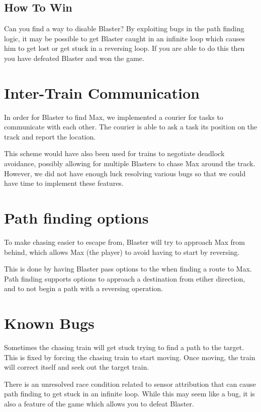 \documentclass[pdftex,10pt,a4paper]{article}
\begin{document}
\subsection*{How To Win}

Can you find a way to disable Blaster? By exploiting bugs in the path
finding logic, it may be possible to get Blaster caught in an infinite
loop which causes him to get lost or get stuck in a reversing loop. If
you are able to do this then you have defeated Blaster and won the
game.

\section*{Inter-Train Communication}

In order for Blaster to find Max, we implemented a courier for
 tasks to communicate with each other. The courier is able
to ask a  task its position on the track and report the
location.

This scheme would have also been used for trains to negotiate deadlock
avoidance, possibly allowing for multiple Blasters to chase Max around
the track. However, we did not have enough luck resolving various bugs
so that we could have time to implement these features.

\section*{Path finding options}

To make chasing easier to escape from, Blaster will try to approach
Max from behind, which allows Max (the player) to avoid having to
start by reversing.

This is done by having Blaster pass options to the
 when finding a route to Max. Path finding
supports options to approach a destination from etiher direction, and
to not begin a path with a reversing operation.

\section*{Known Bugs}

Sometimes the chasing train will get stuck trying to find a path to
the target. This is fixed by forcing the chasing train to start
moving. Once moving, the train will correct itself and seek out the
target train.

There is an unresolved race condition related to sensor attribution
that can cause path finding to get stuck in an infinite loop. While
this may seem like a bug, it is also a feature of the game which
allows you to defeat Blaster.
\end{document}
